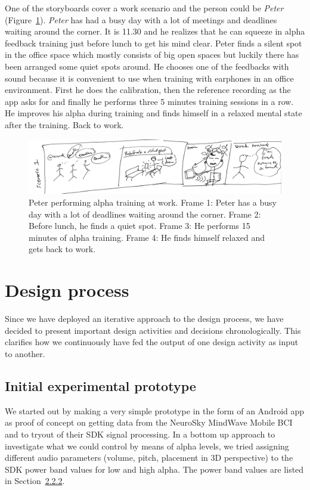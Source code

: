 \documentclass[a4paper,10pt,english,lof,lot,twoside]{puthesis}
\begin{document}
One of the storyboards cover a work scenario and the person could be \emph{Peter}
(Figure \ref{ch-design/index:fig-design-scenario-work}). \emph{Peter} has had a busy day with
a lot of meetings and deadlines waiting around the corner. It is 11.30 and he
realizes that he can squeeze in alpha feedback training just before lunch to get
his mind clear. Peter finds a silent spot in the office space which mostly
consists of big open spaces but luckily there has been arranged some quiet
spots around. He chooses one of the feedbacks with sound because it is
convenient to use when training with earphones in an office environment.
First he does the calibration, then the reference recording as the app
asks for and finally he performs three 5 minutes training sessions in a row. He
improves his alpha during training and finds himself in a relaxed mental state
after the training. Back to work.
\begin{figure}[tbp]
\centering
\capstart

\includegraphics[width=1.000\linewidth]{design-scenario-work1.png}
\caption[Alpha training at work]{Peter performing alpha training at work. Frame 1: Peter has a busy day with a lot of deadlines waiting around the corner. Frame 2: Before lunch, he finds a quiet spot. Frame 3: He performs 15 minutes of alpha training. Frame 4: He finds himself relaxed and gets back to work.}\label{ch-design/index:fig-design-scenario-work}\end{figure}


\section{Design process}
\label{ch-design/index:ch-design-process}\label{ch-design/index:design-process}
Since we have deployed an iterative approach to the design process, we have
decided to present important design activities and decisions
chronologically. This clarifies how we continuously have fed the output of one
design activity as input to another.


\subsection{Initial experimental prototype}
\label{ch-design/index:initial-experimental-prototype}
We started out by making a very simple prototype in the form of an Android app
as proof of concept on getting data from the NeuroSky MindWave Mobile BCI and to
tryout of their SDK signal processing. In a bottom up approach to investigate
what we could control by means of alpha levels, we tried assigning different
audio parameters (volume, pitch, placement in 3D perspective) to the SDK power
band values for low and high alpha. The power band values are listed in Section {\hyperref[ch-background/index:ch-background-mindwave]{2.2.2}}.
\end{document}
